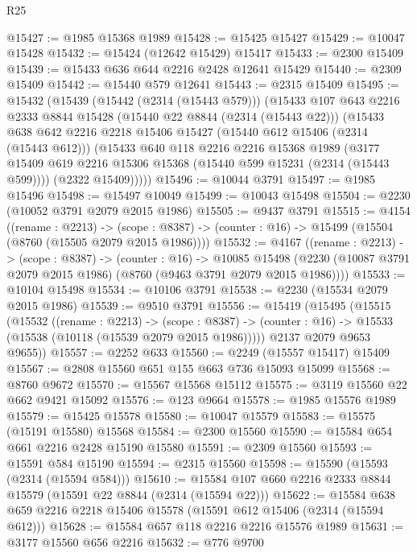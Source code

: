 \begin{lexlean}{R25}
\begin{coremodule}
@15427 := @1985 @15368 @1989
@15428 := @15425 @15427
@15429 := @10047 @15428
@15432 := @15424 (@12642 @15429) @15417
@15433 := @2300 @15409
@15439 := @15433 @636 @644 @2216 @2428 @12641 @15429
@15440 := @2309 @15409
@15442 := @15440 @579 @12641
@15443 := @2315 @15409
@15495 := @15432
    (@15439
      (@15442 (@2314 (@15443 @579)))
      (@15433
        @107
        @643
        @2216
        @2333
        @8844
        @15428
        (@15440 @22 @8844 (@2314 (@15443 @22)))
        (@15433
          @638
          @642
          @2216
          @2218
          @15406
          @15427
          (@15440 @612 @15406 (@2314 (@15443 @612)))
          (@15433
            @640
            @118
            @2216
            @2216
            @15368
            @1989
            (@3177 @15409 @619 @2216 @15306 @15368 (@15440 @599 @15231 (@2314 (@15443 @599))))
            (@2322 @15409)))))
@15496 := @10044 @3791
@15497 := @1985 @15496
@15498 := @15497 @10049
@15499 := @10043 @15498
@15504 := @2230 (@10052 @3791 @2079 @2015 @1986)
@15505 := @9437 @3791
@15515 := @4154
    ((rename : @2213) ->
    (scope : @8387) -> (counter : @16) -> @15499 (@15504 (@8760 (@15505 @2079 @2015 @1986))))
@15532 := @4167
    ((rename : @2213) ->
    (scope : @8387) ->
    (counter : @16) ->
    @10085 @15498 (@2230 (@10087 @3791 @2079 @2015 @1986) (@8760 (@9463 @3791 @2079 @2015 @1986))))
@15533 := @10104 @15498
@15534 := @10106 @3791
@15538 := @2230 (@15534 @2079 @2015 @1986)
@15539 := @9510 @3791
@15556 := @15419
    (@15495
      (@15515
        (@15532
          ((rename : @2213) ->
          (scope : @8387) ->
          (counter : @16) -> @15533 (@15538 (@10118 (@15539 @2079 @2015 @1986)))))
        @2137
        @2079
        @9653
        @9655))
@15557 := @2252 @633
@15560 := @2249 (@15557 @15417) @15409
@15567 := @2808 @15560 @651 @155 @663 @736 @15093 @15099
@15568 := @8760 @9672
@15570 := @15567 @15568 @15112
@15575 := @3119 @15560 @22 @662 @9421 @15092
@15576 := @123 @9664
@15578 := @1985 @15576 @1989
@15579 := @15425 @15578
@15580 := @10047 @15579
@15583 := @15575 (@15191 @15580) @15568
@15584 := @2300 @15560
@15590 := @15584 @654 @661 @2216 @2428 @15190 @15580
@15591 := @2309 @15560
@15593 := @15591 @584 @15190
@15594 := @2315 @15560
@15598 := @15590 (@15593 (@2314 (@15594 @584)))
@15610 := @15584 @107 @660 @2216 @2333 @8844 @15579 (@15591 @22 @8844 (@2314 (@15594 @22)))
@15622 := @15584 @638 @659 @2216 @2218 @15406 @15578 (@15591 @612 @15406 (@2314 (@15594 @612)))
@15628 := @15584 @657 @118 @2216 @2216 @15576 @1989
@15631 := @3177 @15560 @656 @2216
@15632 := @776 @9700

\end{coremodule}
\end{lexlean}
